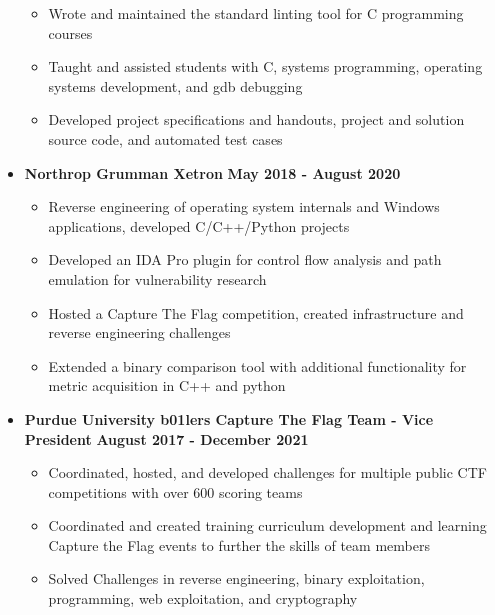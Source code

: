 \documentclass[letterpaper,10pt]{article}
\begin{document}
\begin{flushleft}
\begin{itemize}
            \begin{itemize}
                \item Wrote and maintained the standard linting tool for C programming courses \\
                \item Taught and assisted students with C, systems programming, operating systems development, and gdb debugging \\
                \item Developed project specifications and handouts, project and solution source code, and automated test cases \\
            \end{itemize}
    		\item \textbf{Northrop Grumman Xetron} \hfill \textbf{May 2018 - August 2020} \\
    			\begin{itemize}
                \item Reverse engineering of operating system internals and Windows applications, developed C/C++/Python projects \\
                \item Developed an IDA Pro plugin for control flow analysis and path emulation for vulnerability research \\
                \item Hosted a Capture The Flag competition, created infrastructure and reverse engineering challenges \\
                \item Extended a binary comparison tool with additional functionality for metric acquisition in C++ and python \\
    			\end{itemize}
    		\item \textbf{Purdue University b01lers Capture The Flag Team - Vice President} \hfill \textbf{August 2017 - December 2021} \\
    			\begin{itemize}
                \item Coordinated, hosted, and developed challenges for multiple public CTF competitions with over 600 scoring teams \\
                \item Coordinated and created training curriculum development and learning Capture the Flag events to further the skills of team members \\
                \item Solved Challenges in reverse engineering, binary exploitation, programming, web exploitation, and cryptography

\end{itemize}
\end{itemize}
\end{flushleft}
\end{document}
